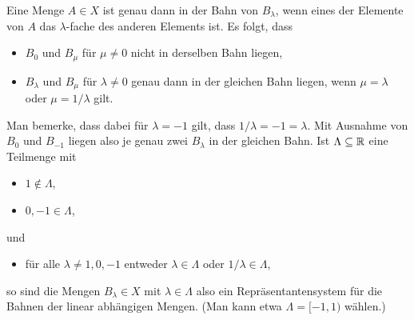 \begin{itemize}
    Eine Menge $A \in X$ ist genau dann in der Bahn von $B_\lambda$, wenn eines der Elemente von $A$ das $\lambda$-fache des anderen Elements ist.
    Es folgt, dass
    \begin{itemize}
      \item
        $B_0$ und $B_\mu$ für $\mu \neq 0$ nicht in derselben Bahn liegen,
      \item
        $B_\lambda$ und $B_\mu$ für $\lambda \neq 0$ genau dann in der gleichen Bahn liegen, wenn $\mu = \lambda$ oder $\mu = 1/\lambda$ gilt.
    \end{itemize}
    Man bemerke, dass dabei für $\lambda = -1$ gilt, dass $1/\lambda = -1 = \lambda$.
    Mit Ausnahme von $B_0$ und $B_{-1}$ liegen also je genau zwei $B_\lambda$ in der gleichen Bahn.
    Ist $\Lambda \subseteq \mathbb{R}$ eine Teilmenge mit
    \begin{itemize}
      \item
        $1 \notin \Lambda$,
      \item
        $0, -1 \in \Lambda$,
    \end{itemize}
    und
    \begin{itemize}[resume]
      \item
        für alle $\lambda \neq 1, 0, -1$ entweder $\lambda \in \Lambda$ oder $1/\lambda \in \Lambda$,
    \end{itemize}
    so  sind die Mengen $B_\lambda \in X$ mit $\lambda \in \Lambda$ also ein Repräsentantensystem für die Bahnen der linear abhängigen Mengen.
    (Man kann etwa $\Lambda = [-1, 1)$ wählen.)
    

\end{itemize}

